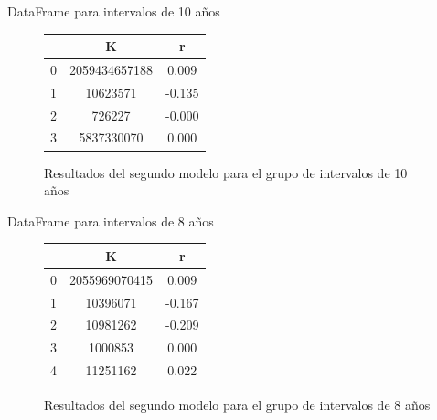 \documentclass{beamer}
\begin{document}
\begin{frame}{DataFrame para intervalos de 10 años}
    \begin{figure}[h!]%
        \begin{center}
            \begin{tabular}{|c|c|c|} \hline
                         & K 			& r 		\\ \hline
                0		 & 2059434657188& 0.009		\\ \hline
                1		 &10623571		& -0.135	\\ \hline
                2		 & 726227		& -0.000	\\ \hline
                3		 & 5837330070	& 0.000		\\ \hline
            \end{tabular}
        \caption{Resultados del segundo modelo para el grupo de intervalos de 10 años \label{fig:ex}}
        \end{center}
    \end{figure}
\end{frame} 

\begin{frame}{DataFrame para intervalos de 8 años}
    \begin{figure}[h!]%
        \begin{center}
            \begin{tabular}{|c|c|c|} \hline
                         & K 			& r 		\\ \hline
                0		 & 2055969070415& 0.009		\\ \hline
                1		 & 10396071	    & -0.167	\\ \hline
                2		 & 10981262	    & -0.209	\\ \hline
                3		 & 1000853	    & 0.000		\\ \hline
                4		 & 11251162	    & 0.022		\\ \hline
            \end{tabular}
        \caption{Resultados del segundo modelo para el grupo de intervalos de 8 años \label{fig:ex}}
        \end{center}
    \end{figure}
\end{frame} 
\end{document}

